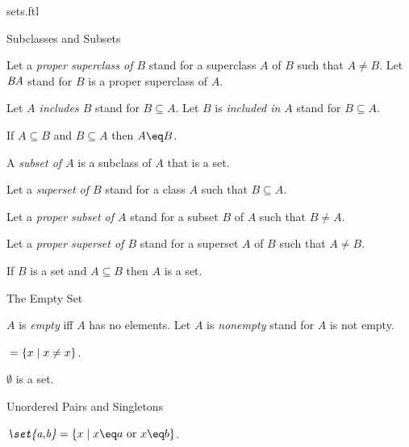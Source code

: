 \documentclass{naproche-library}
\begin{document}
\begin{smodule}[title=Classes and Sets]{sets.ftl}
\begin{sfragment}{Subclasses and Subsets}
\begin{definition}[forthel,id=SubclassDef]
    Let a \emph{proper superclass of $B$} stand for a superclass $A$ of $B$ such that $A \neq B$.
    Let $\emph{B\supsetneq A}$ stand for $B$ is a proper superclass of $A$.

    Let \emph{$A$ includes $B$} stand for $B\subseteq A$.
    Let $B$ is \emph{included in $A$} stand for $B\subseteq A$.
  \end{definition}

  \begin{axiom}[forthel,title=Class Extensionality Axiom,id=ClassExtensionalityAx]
    If $A\subseteq B$ and $B\subseteq A$ then $A\eq B$.
  \end{axiom}

  \begin{definition}[forthel,id=SubsetDef]
    A \emph{subset of $A$} is a subclass of $A$ that is a set.

    Let a \emph{superset of $B$} stand for a class $A$ such that $B\subseteq A$.

    Let a \emph{proper subset of $A$} stand for a subset $B$ of $A$ such that $B\neq A$.

    Let a \emph{proper superset of $B$} stand for a superset $A$ of $B$ such that $A \neq B$.
  \end{definition}

  \begin{axiom}[forthel,title=Separation Axiom,id=SeparationAx]
    If $B$ is a set and $A\subseteq B$ then $A$ is a set.
  \end{axiom}
\end{sfragment}

\begin{sfragment}{The Empty Set}
  \begin{definition}[forthel,id=EmptyDef]
    $A$ is \emph{empty} iff $A$ has no elements.
    Let $A$ is \emph{nonempty} stand for $A$ is not empty.
  \end{definition}

  \begin{definition}[forthel,id=EmptySetDef]
    $\emph{\emptyset}=\{x\mid x\neq x\}$.
  \end{definition}

  \begin{axiom}[forthel,title=Empty Set Axiom,id=EmptySetAx]
    $\emptyset$ is a set.
  \end{axiom}
\end{sfragment}

\begin{sfragment}{Unordered Pairs and Singletons}
  \begin{definition}[forthel,id=UnorderedPairDef]
    $\emph{\set{a,b}}=\{x\mid x\eq a\text{ or }x\eq b\}$.
  \end{definition}


\end{sfragment}
\end{smodule}
\end{document}
